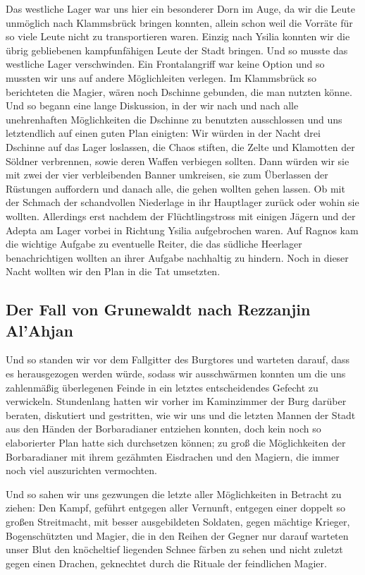 Das westliche Lager war uns hier ein besonderer Dorn im Auge, da wir die Leute unmöglich nach Klammsbrück bringen konnten, allein schon weil die Vorräte für so viele Leute nicht zu transportieren waren. Einzig nach Ysilia konnten wir die übrig gebliebenen kampfunfähigen Leute der Stadt bringen. Und so musste das westliche Lager verschwinden. Ein Frontalangriff war keine Option und so mussten wir uns auf andere Möglichleiten verlegen. Im Klammsbrück so berichteten die Magier, wären noch Dschinne gebunden, die man nutzten könne. Und so begann eine lange Diskussion, in der wir nach und nach alle unehrenhaften Möglichkeiten die Dschinne zu benutzten ausschlossen und uns letztendlich auf einen guten Plan einigten: Wir würden in der Nacht drei Dschinne auf das Lager loslassen, die Chaos stiften, die Zelte und Klamotten der Söldner verbrennen, sowie deren Waffen verbiegen sollten. Dann würden wir sie mit zwei der vier verbleibenden Banner umkreisen, sie zum Überlassen der Rüstungen auffordern und danach alle, die gehen wollten gehen lassen. Ob mit der Schmach der schandvollen Niederlage in ihr Hauptlager zurück oder wohin sie wollten. Allerdings erst nachdem der Flüchtlingstross mit einigen Jägern und der Adepta am Lager vorbei in Richtung Ysilia aufgebrochen waren. Auf Ragnos kam die wichtige Aufgabe zu eventuelle Reiter, die das südliche Heerlager benachrichtigen wollten an ihrer Aufgabe nachhaltig zu hindern. Noch in dieser Nacht wollten wir den Plan in die Tat umsetzten.

\subsection{Der Fall von Grunewaldt nach Rezzanjin Al'Ahjan}

Und so standen wir vor dem Fallgitter des Burgtores und warteten darauf, dass es herausgezogen werden würde, sodass wir ausschwärmen konnten um die uns zahlenmäßig überlegenen Feinde in ein letztes entscheidendes Gefecht zu verwickeln. Stundenlang hatten wir vorher im Kaminzimmer der Burg darüber beraten, diskutiert und gestritten, wie wir uns und die letzten Mannen der Stadt aus den Händen der Borbaradianer entziehen konnten, doch kein noch so elaborierter Plan hatte sich durchsetzen können; zu groß die Möglichkeiten der Borbaradianer mit ihrem gezähmten Eisdrachen und den Magiern, die immer noch viel auszurichten vermochten. 

Und so sahen wir uns gezwungen die letzte aller Möglichkeiten in Betracht zu ziehen: Den Kampf, geführt entgegen aller Vernunft, entgegen einer doppelt so großen Streitmacht, mit besser ausgebildeten Soldaten, gegen mächtige Krieger, Bogenschützten und Magier, die in den Reihen der Gegner nur darauf warteten unser Blut den knöcheltief liegenden Schnee färben zu sehen und nicht zuletzt gegen einen Drachen, geknechtet durch die Rituale der feindlichen Magier.

